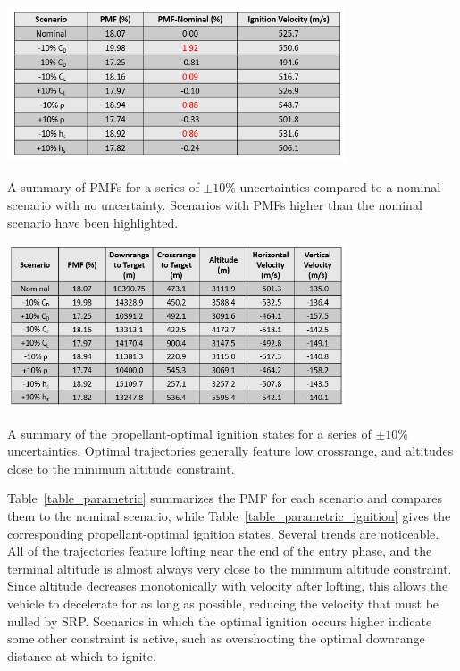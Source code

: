 \documentclass[letterpaper, preprint, paper,11pt]{AAS}
\begin{document}
\begin{table}[h!]
	\centering
	\includegraphics[width=0.75\textwidth]{ParametricSensitivityTable} 
	\caption{A summary of PMFs for a series of $\pm10\%$ uncertainties compared to a nominal scenario with no uncertainty. Scenarios with PMFs higher than the nominal scenario have been highlighted.}
	\label{table_parametric}
\end{table}

\begin{table}[h!]
	\centering
	\includegraphics[width=0.75\textwidth]{ParametricSensitivityIgnitionTable} 
	\caption{A summary of the propellant-optimal ignition states for a series of $\pm10\%$ uncertainties. Optimal trajectories generally feature low crossrange, and altitudes close to the minimum altitude constraint.}
	\label{table_parametric_ignition}
\end{table}


 
Table~\ref{table_parametric} summarizes the PMF for each scenario and compares them to the nominal scenario, while Table~\ref{table_parametric_ignition} gives the corresponding propellant-optimal ignition states. Several trends are noticeable. All of the trajectories feature lofting near the end of the entry phase, and the terminal altitude is almost always very close to the minimum altitude constraint. Since altitude decreases monotonically with velocity after lofting, this allows the vehicle to decelerate for as long as possible, reducing the velocity that must be nulled by SRP. Scenarios in which the optimal ignition occurs higher indicate some other constraint is active, such as overshooting the optimal downrange distance at which to ignite.  
\end{document}
